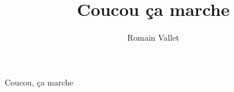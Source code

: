 \documentclass{article}
\title{Coucou ça marche}
\author{Romain Vallet}
\begin{document}
\maketitle

Coucou, ça marche
\end{document}
